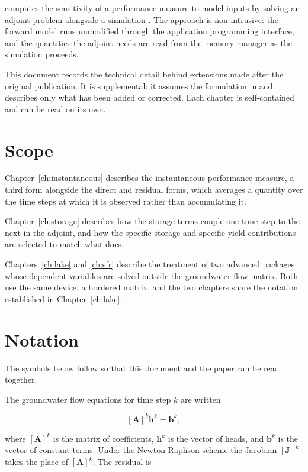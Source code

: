 \adj{} computes the sensitivity of a performance measure to model inputs by
solving an adjoint problem alongside a \mf{} simulation \citep{hayek2025}. The
approach is non-intrusive: the forward model runs unmodified through the
\mf{} application programming interface, and the quantities the adjoint needs
are read from the memory manager as the simulation proceeds.

This document records the technical detail behind extensions made after the
original publication. It is supplemental: it assumes the formulation in
\citet{hayek2025} and describes only what has been added or corrected. Each
chapter is self-contained and can be read on its own.

\section{Scope}

Chapter~\ref{ch:instantaneous} describes the instantaneous performance measure,
a third form alongside the direct and residual forms, which averages a quantity
over the time steps at which it is observed rather than accumulating it.

Chapter~\ref{ch:storage} describes how the storage terms couple one time step to
the next in the adjoint, and how the specific-storage and specific-yield
contributions are selected to match what \mf{} does.

Chapters~\ref{ch:lake} and \ref{ch:sfr} describe the treatment of two advanced
packages whose dependent variables are solved outside the groundwater flow
matrix. Both use the same device, a bordered matrix, and the two chapters share
the notation established in Chapter~\ref{ch:lake}.

\section{Notation}

The symbols below follow \citet{hayek2025} so that this document and the paper
can be read together.

The groundwater flow equations for time step $k$ are written

\begin{equation}
	\label{eqn:forward}
	\left[ \mathbf{A} \right]^{k} \mathbf{h}^{k} = \mathbf{b}^{k},
\end{equation}

\noindent where $\left[ \mathbf{A} \right]^{k}$ is the matrix of coefficients,
$\mathbf{h}^{k}$ is the vector of heads, and $\mathbf{b}^{k}$ is the vector of
constant terms. Under the Newton-Raphson scheme the Jacobian
$\left[ \mathbf{J} \right]^{k}$ takes the place of
$\left[ \mathbf{A} \right]^{k}$. The residual is

